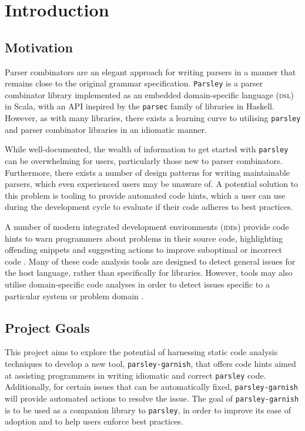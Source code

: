 \chapter{Introduction}

\section{Motivation}
Parser combinators \cite{hutton_higher-order_1992} are an elegant approach for writing parsers in a manner that remains close to the original grammar specification.
\texttt{Parsley} \cite{willis_garnishing_2018} is a parser combinator library implemented as an embedded domain-specific language (\textsc{dsl}) \cite{hudak_building_1996} in Scala, with an API inspired by the \texttt{parsec} \cite{leijen_parsec_2001} family of libraries in Haskell.
However, as with many libraries, there exists a learning curve to utilising \texttt{parsley} and parser combinator libraries in an idiomatic manner.

While well-documented, the wealth of information to get started with \texttt{parsley} can be overwhelming for users, particularly those new to parser combinators.
Furthermore, there exists a number of design patterns \cite{willis_design_2022} for writing maintainable parsers, which even experienced users may be unaware of.
A potential solution to this problem is tooling to provide automated code hints, which a user can use during the development cycle to evaluate if their code adheres to best practices.


A number of modern integrated development environments (\textsc{ide}s) provide code hints to warn programmers about problems in their source code, highlighting offending snippets and suggesting actions to improve suboptimal or incorrect code \cite{kurbatova_intellij_2021}.
Many of these code analysis tools are designed to detect general issues for the host language, rather than specifically for libraries.
However, tools may also utilise domain-specific code analyses in order to detect issues specific to a particular system or problem domain \cite{renggli_domain-specific_2010,gregor_stllint_2006}.

\section{Project Goals}
This project aims to explore the potential of harnessing static code analysis techniques to develop a new tool, \texttt{parsley-garnish}, that offers code hints aimed at assisting programmers in writing idiomatic and correct \texttt{parsley} code.
Additionally, for certain issues that can be automatically fixed, \texttt{parsley-garnish} will provide automated actions to resolve the issue. %
The goal of \texttt{parsley-garnish} is to be used as a companion library to \texttt{parsley}, in order to improve its ease of adoption and to help users enforce best practices.
